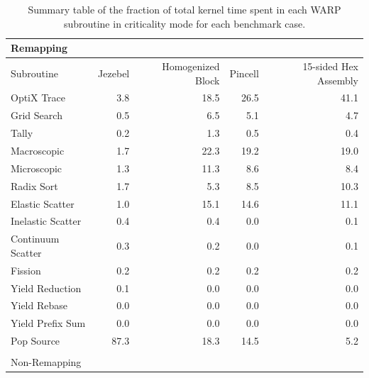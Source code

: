 \begin{table}[h!]
\centering
\caption{Summary table of the fraction of total kernel time spent in each WARP subroutine in criticality mode for each benchmark case.}
\label{profile_summary}
\begin{tabular}{| l | r  | r | r | r |}
\multicolumn{5}{l}{Remapping} \\
 \hline
 Subroutine        & Jezebel & Homogenized Block & Pincell & 15-sided Hex Assembly  \\
 \hline \hline
 OptiX Trace       & 3.8       &    18.5                        &   26.5    &      41.1    \\ \hline
 Grid Search       & 0.5       &    6.5                         &   5.1       &      4.7       \\ \hline
 Tally                   & 0.2       &    1.3                         &   0.5       &      0.4       \\ \hline
 Macroscopic      & 1.7       &   22.3                        &   19.2      &     19.0     \\ \hline
 Microscopic       & 1.3       &    11.3                        &  8.6        &      8.4       \\ \hline
 Radix Sort         & 1.7       &     5.3                         &   8.5       &      10.3     \\ \hline
 Elastic Scatter   & 1.0       &     15.1                       &   14.6    &      11.1    \\ \hline
 Inelastic Scatter & 0.4       &     0.4                         &   0.0      &       0.1   \\ \hline
 Continuum Scatter & 0.3   &     0.2                         &   0.0      &       0.1   \\ \hline
 Fission               & 0.2       &      0.2                        &   0.2      &       0.2     \\ \hline
 Yield Reduction  & 0.1       &      0.0                        &   0.0     &       0.0    \\ \hline
 Yield Rebase     & 0.0        &     0.0                         &   0.0     &       0.0   \\ \hline
 Yield Prefix Sum &  0.0       &    0.0                         &   0.0     &       0.0   \\ \hline
 Pop Source         &  87.3     &    18.3                       &   14.5   &      5.2    \\ 
\hline
\multicolumn{5}{l}{} \\
\multicolumn{5}{l}{Non-Remapping} \\

\end{tabular}
\end{table}
